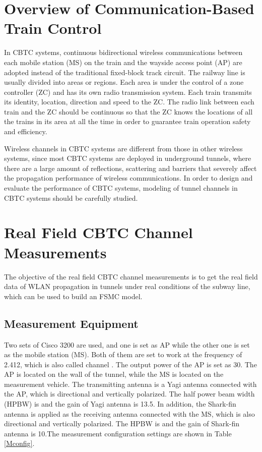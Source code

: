 \documentclass[conference]{IEEEtran}
\begin{document}
\section{Overview of Communication-Based Train Control}
\label{OverviewCBTC}
In CBTC systems, continuous bidirectional wireless communications between each mobile station (MS) on the train and the wayside access point (AP) are adopted instead of the traditional fixed-block track circuit. The railway line is usually divided into areas or regions. Each area is under the control of a zone controller (ZC) and has its own radio transmission system. Each train transmits its identity, location, direction and speed to the ZC. The radio link between each train and the ZC should be continuous so that the ZC knows the locations of all the trains in its area at all the time in order to guarantee train operation safety and efficiency.



Wireless channels in CBTC systems are different from those in other wireless systems, since most CBTC systems are deployed in underground tunnels, where there are a large amount of reflections, scattering and barriers that  severely affect the propagation performance of wireless communications. In order to design and evaluate the performance of CBTC systems,  modeling of tunnel channels in CBTC systems should be carefully studied.

\section{Real Field CBTC Channel Measurements}
\label{Sec_Measurement}
The objective of the real field CBTC channel measurements  is to get the real field data of WLAN propagation in tunnels under real conditions of the subway line, which can be used to build an FSMC model.





\subsection{Measurement Equipment}
Two sets of Cisco 3200 are used, and one is set as AP while the other one is set as the mobile station (MS). Both of them are set to work at the frequency of 2.412, which is also called channel . The output power of the AP is set as 30. The AP is located on the wall of the  tunnel,
while the MS is located on the measurement vehicle. The transmitting antenna is a Yagi antenna connected with the AP, which is directional and vertically polarized. The half power beam width (HPBW) is   and the gain of Yagi antenna is 13.5. In addition, the Shark-fin antenna is applied as the receiving antenna connected with the MS, which is also directional and vertically polarized. The HPBW is   and the gain of Shark-fin antenna is 10.The measurement configuration settings are shown in Table \ref{Mconfig}.
\end{document}
